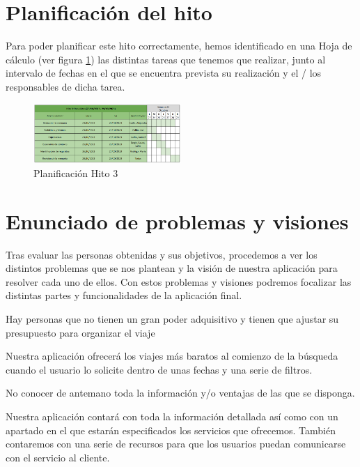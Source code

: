 \section{Planificación del hito}
Para poder planificar este hito correctamente, hemos identificado en una Hoja de cálculo (ver figura \ref{fig:planif-hito3}) las distintas tareas que tenemos que 
realizar, junto al intervalo de fechas en el que se encuentra prevista su realización y el / los responsables de dicha tarea.
\begin{figure}[H]
    \centering 
    \includegraphics[width=0.5\textwidth]{./Imagenes/Planificaciones/Planif-hito3.png}
    \caption{Planificación Hito 3}
    \label{fig:planif-hito3}
\end{figure}

\section{Enunciado de problemas y visiones}

Tras evaluar las personas obtenidas y sus objetivos, procedemos a ver los distintos problemas que se nos plantean y la visión de nuestra aplicación para resolver cada uno de ellos. Con estos problemas y visiones podremos focalizar las distintas partes y funcionalidades de la aplicación final.

\begin{problema}

    Hay personas que no tienen un gran poder adquisitivo y tienen que ajustar su presupuesto para organizar el viaje 

    {\centering
    \begin{vision} \justifying \noindent
        Nuestra aplicación ofrecerá los viajes más baratos al comienzo de la búsqueda cuando el usuario lo solicite dentro de unas fechas y una serie de filtros.

    \end{vision}}
\end{problema}

\vspace{0.5cm}

\begin{problema}
    No conocer de antemano toda la información y/o ventajas de las que se disponga.

    {\centering
    \begin{vision}\justifying \noindent
        Nuestra aplicación contará con toda la información detallada así como con un apartado en el que estarán especificados los servicios que ofrecemos. También contaremos con una serie de recursos para que los usuarios puedan comunicarse con el servicio al cliente.
    \end{vision}}
\end{problema}


